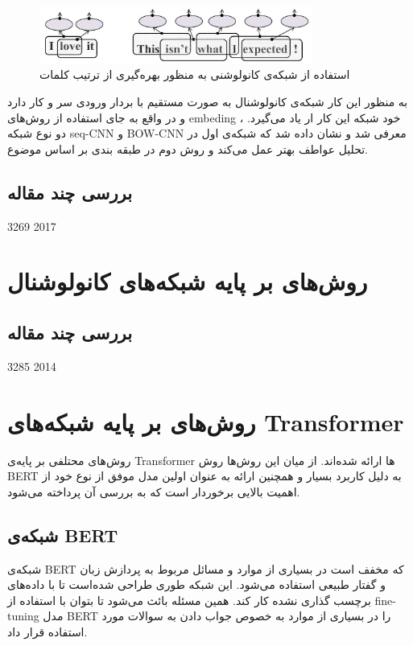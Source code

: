 \documentclass[12pt, a4paper, oneside]{report}
\begin{document}
\begin{figure}[h]
    \centering
    \includegraphics[width=0.8\textwidth]{cnn-in-text}
    \caption{ استفاده از شبکه‌ی کانولوشنی به منظور بهره‌گیری از ترتیب کلمات }
    \label{fig:cnn-in-text}
\end{figure}

به منظور این کار شبکه‌ی کانولوشنال به صورت مستقیم با بردار ورودی سر و کار دارد و در واقع به جای استفاده از
روش‌های
embeding
، خود شبکه این کار ار یاد می‌گیرد. دو نوع شبکه
seq-CNN
و
BOW-CNN
معرفی شد و نشان داده شد که شبکه‌ی اول در تحلیل عواطف بهتر عمل می‌کند و روش دوم در طبقه بندی بر اساس موضوع.
\cite{johnson-zhang-2015-effective}

\subsection{بررسی چند مقاله}

\cite{yang-etal-2016-hierarchical} 3269 2017

\section{روش‌های بر پایه شبکه‌های کانولوشنال}

\subsection{بررسی چند مقاله}

\cite{kalchbrenner-etal-2014-convolutional} 3285 2014

\section{روش‌های بر پایه شبکه‌های Transformer}

روش‌های محتلفی بر پایه‌ی
Transformer
ها ارائه شده‌اند. از میان این روش‌ها روش
BERT
به دلیل کاربرد بسیار و همچنین ارائه به عنوان اولین مدل موفق از نوع خود از اهمیت بالایی برخوردار است که به بررسی آن
پرداخته می‌شود.

\subsection{شبکه‌ی BERT}

شبکه‌ی
BERT
که مخفف
است در بسیاری از موارد و مسائل مربوط به پردازش زبان و گفتار طبیعی استفاده می‌شود.
این شبکه طوری طراحی شده‌است تا با داده‌های برچسب گذاری نشده کار کند. همین مسئله بائث می‌شود تا بتوان با استفاده از
fine-tuning
مدل
BERT
را در بسیاری از موارد به خصوص جواب دادن به سوالات مورد استفاده قرار داد. 
\end{document}
